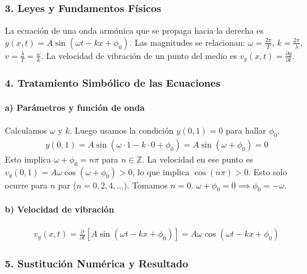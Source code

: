\subsubsection*{3. Leyes y Fundamentos Físicos}
La ecuación de una onda armónica que se propaga hacia la derecha es $y(x,t) = A \sin(\omega t - kx + \phi_0)$.
Las magnitudes se relacionan: $\omega = \frac{2\pi}{T}$, $k = \frac{2\pi}{\lambda}$, $v = \frac{\lambda}{T} = \frac{\omega}{k}$.
La velocidad de vibración de un punto del medio es $v_y(x,t) = \frac{\partial y}{\partial t}$.

\subsubsection*{4. Tratamiento Simbólico de las Ecuaciones}
\paragraph*{a) Parámetros y función de onda}
Calculamos $\omega$ y $k$. Luego usamos la condición $y(0,1)=0$ para hallar $\phi_0$.
\begin{gather}
    y(0,1) = A \sin(\omega \cdot 1 - k \cdot 0 + \phi_0) = A \sin(\omega + \phi_0) = 0
\end{gather}
Esto implica $\omega + \phi_0 = n\pi$ para $n \in \mathbb{Z}$.
La velocidad en ese punto es $v_y(0,1) = A\omega \cos(\omega + \phi_0) > 0$, lo que implica $\cos(n\pi)>0$. Esto solo ocurre para $n$ par ($n=0, 2, 4, ...$). Tomamos $n=0$.
$\omega + \phi_0 = 0 \implies \phi_0 = -\omega$.

\paragraph*{b) Velocidad de vibración}
\begin{gather}
    v_y(x,t) = \frac{\partial}{\partial t} [A \sin(\omega t - kx + \phi_0)] = A\omega \cos(\omega t - kx + \phi_0)
\end{gather}

\subsubsection*{5. Sustitución Numérica y Resultado}
